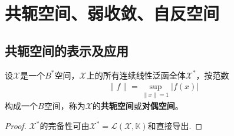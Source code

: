 \documentclass[../../main.tex]{subfiles}%
\begin{document}
\section{共轭空间、弱收敛、自反空间}

\subsection{共轭空间的表示及应用}

\begin{theorem}\label{theorem:共轭空间的完备性}
设$\mathscr{X}$是一个$B^*$空间，$\mathscr{X}$上的所有连续线性泛函全体$\mathscr{X}^*$，按范数
\begin{align*}
\|f\|=\sup\limits_{\|x\|=1}|f(x)|
\end{align*}
构成一个$B$空间，称为$\mathscr{X}$的\textbf{共轭空间}或\textbf{对偶空间}。
\end{theorem}
\begin{proof}
$\mathscr{X}^*$的完备性可由$\mathscr{X}^*=\mathscr{L}(\mathscr{X},\mathbb{K})$和直接导出.
\end{proof}
\end{document}
